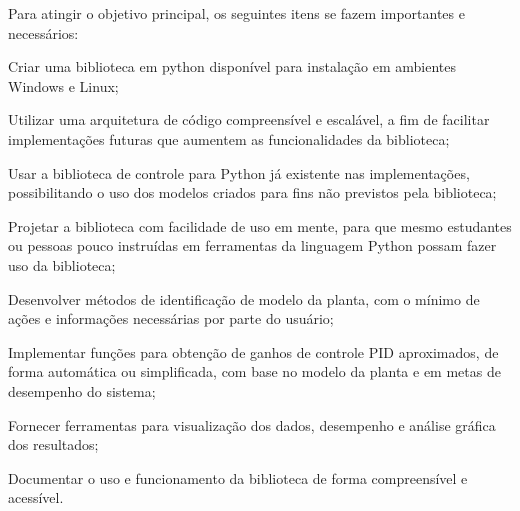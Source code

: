 Para atingir o objetivo principal, os seguintes itens se fazem importantes e necessários:
\begin{alineas}
    \item Criar uma biblioteca em python disponível para instalação em ambientes Windows e Linux;
    \item Utilizar uma arquitetura de código compreensível e escalável, a fim de facilitar implementações futuras
    que aumentem as funcionalidades da biblioteca;
    \item Usar a biblioteca de controle para Python já existente nas implementações, possibilitando o uso dos modelos
    criados para fins não previstos pela biblioteca;
    \item Projetar a biblioteca com facilidade de uso em mente, para que mesmo estudantes ou pessoas pouco instruídas
    em ferramentas da linguagem Python possam fazer uso da biblioteca;
    \item Desenvolver métodos de identificação de modelo da planta, com o mínimo de ações e informações necessárias por
    parte do usuário;
    \item Implementar funções para obtenção de ganhos de controle PID aproximados, de forma automática ou simplificada,
    com base no modelo da planta e em metas de desempenho do sistema;
    \item Fornecer ferramentas para visualização dos dados, desempenho e análise gráfica dos resultados;
    \item Documentar o uso e funcionamento da biblioteca de forma compreensível e acessível.
\end{alineas}
